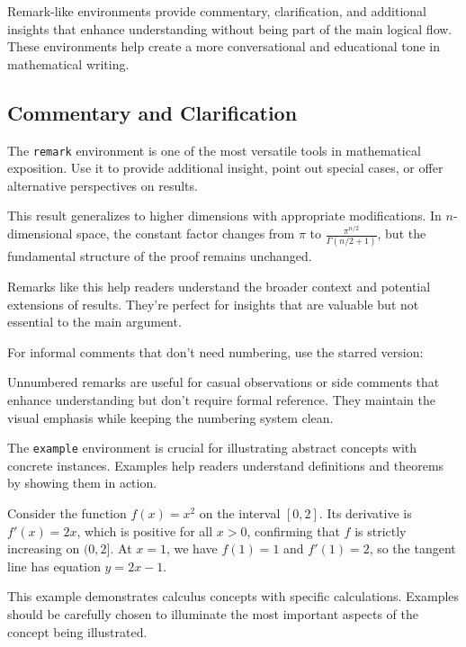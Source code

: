 \documentclass[9pt]{amsart}
\begin{document}
Remark-like environments provide commentary, clarification, and additional
insights that enhance understanding without being part of the main logical
flow. These environments help create a more conversational and educational tone
in mathematical writing.

\subsection{Commentary and Clarification}

The \texttt{remark} environment is one of the most versatile tools in
mathematical exposition. Use it to provide additional insight, point out
special cases, or offer alternative perspectives on results.

\begin{remark}
	This result generalizes to higher dimensions with appropriate modifications. In $n$-dimensional space, the constant factor changes from $\pi$ to $\frac{\pi^{n/2}}{\Gamma(n/2 + 1)}$, but the fundamental structure of the proof remains unchanged.
\end{remark}

Remarks like this help readers understand the broader context and potential
extensions of results. They're perfect for insights that are valuable but not
essential to the main argument.

For informal comments that don't need numbering, use the starred version:

\begin{remark*}
	Unnumbered remarks are useful for casual observations or side comments that enhance understanding but don't require formal reference. They maintain the visual emphasis while keeping the numbering system clean.
\end{remark*}

The \texttt{example} environment is crucial for illustrating abstract concepts
with concrete instances. Examples help readers understand definitions and
theorems by showing them in action.

\begin{example}
	Consider the function $f(x) = x^2$ on the interval $[0, 2]$. Its derivative is $f'(x) = 2x$, which is positive for all $x > 0$, confirming that $f$ is strictly increasing on $(0, 2]$. At $x = 1$, we have $f(1) = 1$ and $f'(1) = 2$, so the tangent line has equation $y = 2x - 1$.
\end{example}

This example demonstrates calculus concepts with specific calculations.
Examples should be carefully chosen to illuminate the most important aspects of
the concept being illustrated.
\end{document}

